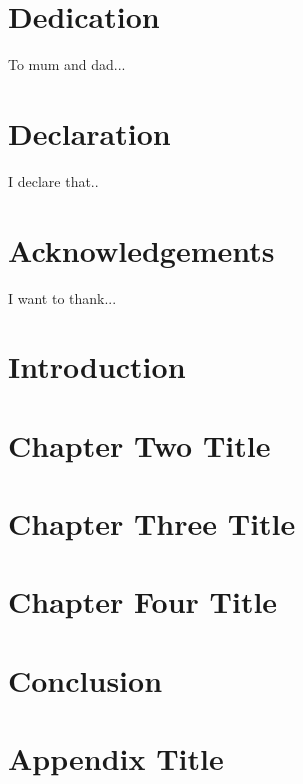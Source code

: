 \documentclass[12pt, twoside]{report}
\begin{document}




\chapter*{Dedication}
To mum and dad...

\chapter*{Declaration}
I declare that..

\chapter*{Acknowledgements}
I want to thank...

\tableofcontents

\listoffigures

\listoftables

\chapter{Introduction}


\chapter{Chapter Two Title}


\chapter{Chapter Three Title}


\chapter{Chapter Four Title}


\chapter{Conclusion}


\appendix
\chapter{Appendix Title}


\printbibliography
\end{document}
